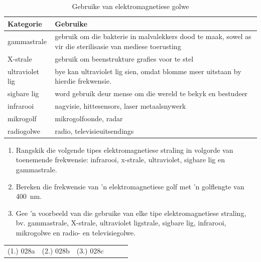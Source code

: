 \begin{table}[H]
    \begin{center}
    \begin{tabular}{|l|m{10cm}|}\hline
    \textbf{Kategorie}
    &
    \textbf{Gebruike} \\ \hline
    gammastrale &
    gebruik om die bakterie in malvalekkers dood te maak, sowel as vir die sterilisasie van mediese toerusting \\ \hline
    
    X-strale &
    gebruik om beenstrukture grafies voor te stel \\ \hline
    
    ultraviolet lig &
    bye kan ultraviolet lig sien, omdat blomme meer uitstaan by hierdie frekwensie.\\ \hline
    sigbare lig &
    word gebruik deur mense om die wereld te bekyk en bestudeer \\ \hline
    infrarooi &
    nagvisie, hittesensors, laser metaalsnywerk \\ \hline 
    mikrogolf &
    mikrogolfoonde, radar \\ \hline 
    radiogolwe &
    radio, televisieuitsendings\\ \hline
    \end{tabular}
    \end{center}
\caption{Gebruike van e\-lek\-tro\-mag\-ne\-tie\-se golwe}
\label{table:EMUses}
\end{table}


\begin{exercises}{}{
\begin{enumerate}[noitemsep, label=\textbf{\arabic*}. ] 
    \item Rangskik die volgende tipes e\-lek\-tro\-mag\-ne\-tie\-se straling in volgorde van toenemende frekwensie: infrarooi, x-strale, ultraviolet, sigbare lig en gammastrale.\newline
    \item Bereken die frekwensie van 'n e\-lek\-tro\-mag\-ne\-tie\-se golf met 'n golflengte van 400~nm.\newline
    \item Gee 'n voorbeeld van die gebruike van elke tipe e\-lek\-tro\-mag\-ne\-tie\-se straling, bv. gammastrale, X-strale, ultraviolet ligstrale, sigbare lig, infrarooi, mikrogolwe en radio- en televisiegolwe.\newline
\end{enumerate}
\label{m38778*cid6}
\practiceinfo
 \par \begin{tabular}[h]{cccccc}
 (1.) 028a  &  (2.) 028b  &  (3.) 028c  & \end{tabular}
}\end{exercises}

